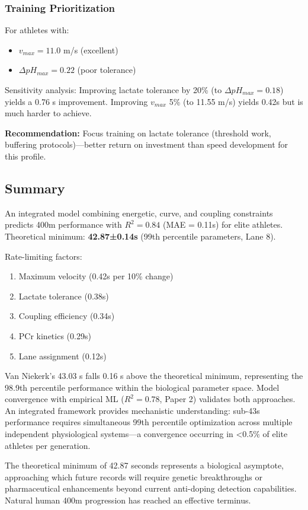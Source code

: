 \subsubsection{Training Prioritization}

For athletes with:
\begin{itemize}
    \item $v_{max} = 11.0$ m/s (excellent)
    \item $\Delta pH_{max} = 0.22$ (poor tolerance)
\end{itemize}

Sensitivity analysis: Improving lactate tolerance by 20\% (to $\Delta pH_{max} = 0.18$) yields a 0.76 s improvement. Improving $v_{max}$ 5\% (to 11.55 m/s) yields 0.42s but is much harder to achieve.

\textbf{Recommendation:} Focus training on lactate tolerance (threshold work, buffering protocols)—better return on investment than speed development for this profile.

\subsection{Summary}

An integrated model combining energetic, curve, and coupling constraints predicts 400m performance with $R^2 = 0.84$ (MAE = 0.11s) for elite athletes. Theoretical minimum: \textbf{42.87±0.14s} (99th percentile parameters, Lane 8).

Rate-limiting factors:
\begin{enumerate}
    \item Maximum velocity (0.42s per 10\% change)
    \item Lactate tolerance (0.38s)
    \item Coupling efficiency (0.34s)
    \item PCr kinetics (0.29s)
    \item Lane assignment (0.12s)
\end{enumerate}

Van Niekerk's 43.03 s falls 0.16 s above the theoretical minimum, representing the 98.9th percentile performance within the biological parameter space. Model convergence with empirical ML ($R^2 = 0.78$, Paper 2) validates both approaches. An integrated framework provides mechanistic understanding: sub-43s performance requires simultaneous 99th percentile optimization across multiple independent physiological systems—a convergence occurring in <0.5\% of elite athletes per generation.

The theoretical minimum of 42.87 seconds represents a biological asymptote, approaching which future records will require genetic breakthroughs or pharmaceutical enhancements beyond current anti-doping detection capabilities. Natural human 400m progression has reached an effective terminus.
